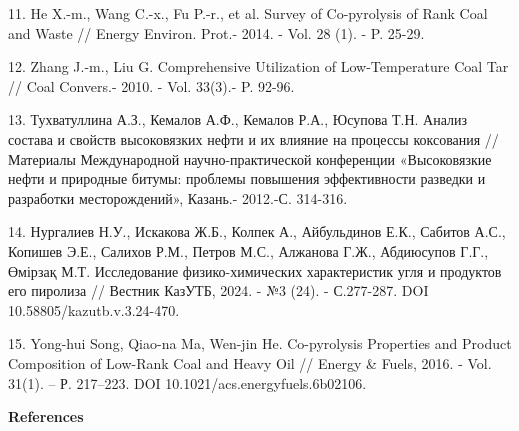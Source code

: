 \begin{references}
11. He X.-m., Wang C.-x., Fu P.-r., et al. Survey of Co-pyrolysis of
Rank Coal and Waste // Energy Environ. Prot.- 2014. - Vol. 28 (1). - P.
25-29.

12. Zhang J.-m., Liu G. Comprehensive Utilization of Low-Temperature
Coal Tar // Coal Convers.- 2010. - Vol. 33(3).- P. 92-96.

13. Тухватуллина А.З., Кемалов А.Ф., Кемалов Р.А., Юсупова Т.Н. Анализ
состава и свойств высоковязких нефти и их влияние на процессы коксования
// Материалы Международной научно-практической конференции «Высоковязкие
нефти и природные битумы: проблемы повышения эффективности разведки и
разработки месторождений», Казань.- 2012.-С. 314-316.

14. Нургалиев Н.У., Искакова Ж.Б., Колпек А., Айбульдинов Е.К., Сабитов
А.С., Копишев Э.Е., Салихов Р.М., Петров М.С., Алжанова Г.Ж., Абдиюсупов
Г.Г., Өмірзақ М.Т. Исследование физико-химических характеристик угля и
продуктов его пиролиза // Вестник КазУТБ, 2024. - №3 (24). - С.277-287.
DOI 10.58805/kazutb.v.3.24-470.

15. Yong-hui Song, Qiao-na Ma, Wen-jin He. Co-pyrolysis Properties and
Product Composition of Low-Rank Coal and Heavy Oil // Energy \& Fuels,
2016. - Vol. 31(1). -- Р. 217--223. DOI
10.1021/acs.energyfuels.6b02106.~
\end{references}

\begin{center}
{\bfseries References}
\end{center}

